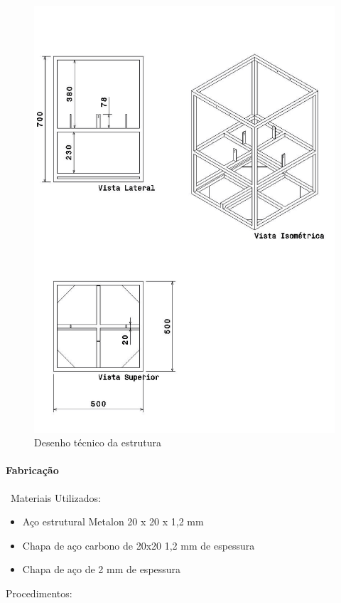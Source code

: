 \begin{figure}[H]
\centering
\includegraphics[width=16cm]{figuras/desenhoestrutura.png}
\caption{Desenho técnico da estrutura}
\end{figure}

\paragraph*{Fabricação}\
Materiais Utilizados:
\begin{itemize}
\item Aço estrutural Metalon 20 x 20 x 1,2 mm
\item Chapa de aço carbono de 20x20 1,2 mm de espessura
\item Chapa de aço de 2 mm de espessura
\end{itemize}

Procedimentos:

